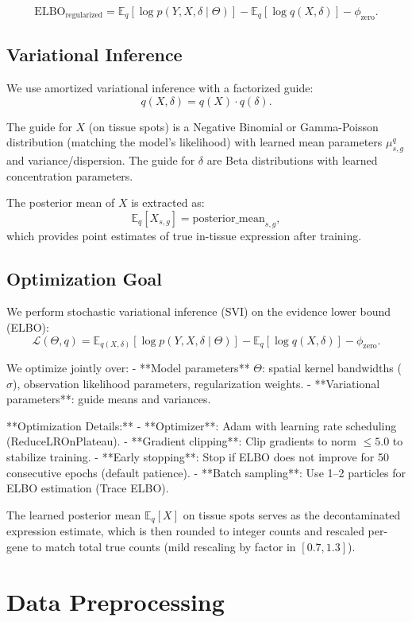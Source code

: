 \documentclass[11pt]{article}
\begin{document}
\[
\text{ELBO}_{\text{regularized}} = \mathbb{E}_{q}\left[\log p(Y,X,\delta\mid\Theta)\right] - \mathbb{E}_{q}\left[\log q(X,\delta)\right] - \phi_{\text{zero}}.
\]

\subsection{Variational Inference}

We use amortized variational inference with a factorized guide:
\[
q(X, \delta) = q(X) \cdot q(\delta).
\]

The guide for $X$ (on tissue spots) is a Negative Binomial or Gamma-Poisson distribution (matching the model's likelihood) with learned mean parameters $\mu^q_{s,g}$ and variance/dispersion. The guide for $\delta$ are Beta distributions with learned concentration parameters.

The posterior mean of $X$ is extracted as:
\[
\mathbb{E}_q[X_{s,g}] = \text{posterior\_mean}_{s,g},
\]
which provides point estimates of true in-tissue expression after training.

\subsection{Optimization Goal}

We perform stochastic variational inference (SVI) on the evidence lower bound (ELBO):
\[
\mathcal{L}(\Theta, q) = \mathbb{E}_{q(X,\delta)}\left[\log p(Y, X, \delta \mid \Theta)\right] - \mathbb{E}_{q}\left[\log q(X, \delta)\right] - \phi_{\text{zero}}.
\]

We optimize jointly over:
- **Model parameters** $\Theta$: spatial kernel bandwidths ($\sigma$), observation likelihood parameters, regularization weights.
- **Variational parameters**: guide means and variances.

**Optimization Details:**
- **Optimizer**: Adam with learning rate scheduling (ReduceLROnPlateau).
- **Gradient clipping**: Clip gradients to norm $\le 5.0$ to stabilize training.
- **Early stopping**: Stop if ELBO does not improve for 50 consecutive epochs (default patience).
- **Batch sampling**: Use 1–2 particles for ELBO estimation (Trace ELBO).

The learned posterior mean $\mathbb{E}_q[X]$ on tissue spots serves as the decontaminated expression estimate, which is then rounded to integer counts and rescaled per-gene to match total true counts (mild rescaling by factor in $[0.7, 1.3]$).

\section{Data Preprocessing}
\end{document}
